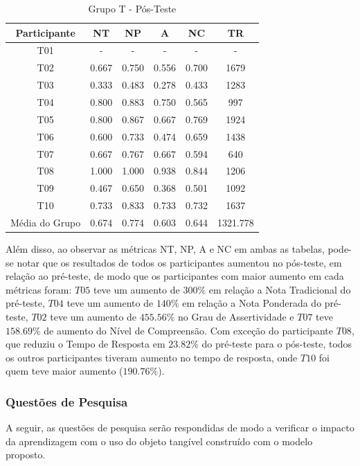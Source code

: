 \begin{table}[htbp]
	\centering
	\caption{Grupo T - Pós-Teste}		
	\begin{tabular}{|c|c|c|c|c|c|}
		\hline
		\rowcolor[HTML]{C0C0C0} 
		\textbf{Participante} & \textbf{NT} & \textbf{NP} & \textbf{A} & \textbf{NC} & \textbf{TR} \\ \hline
		T01 & - & - & - & - & - \\ \hline
		\rowcolor[HTML]{EFEFEF} 
		T02 & 0.667 & 0.750 & 0.556 & 0.700 & 1679 \\ \hline
		T03 & 0.333 & 0.483 & 0.278 & 0.433 & 1283 \\ \hline
		\rowcolor[HTML]{EFEFEF} 
		T04 & 0.800 & 0.883 & 0.750 & 0.565 & 997 \\ \hline
		T05 & 0.800 & 0.867 & 0.667 & 0.769 & 1924 \\ \hline
		\rowcolor[HTML]{EFEFEF} 
		T06 & 0.600 & 0.733 & 0.474 & 0.659 & 1438 \\ \hline
		T07 & 0.667 & 0.767 & 0.667 & 0.594 & 640 \\ \hline
		\rowcolor[HTML]{EFEFEF} 
		T08 & 1.000 & 1.000 & 0.938 & 0.844 & 1206 \\ \hline
		T09 & 0.467 & 0.650 & 0.368 & 0.501 & 1092 \\ \hline
		\rowcolor[HTML]{EFEFEF} 
		T10 & 0.733 & 0.833 & 0.733 & 0.732 & 1637 \\ \hline
		Média do Grupo & 0.674 & 0.774 & 0.603 & 0.644 & 1321.778 \\ \hline
	\end{tabular}
	\label{tab:F1_A01-posteste}
\end{table}

Além disso, ao observar as métricas NT, NP, A e NC em ambas as tabelas, pode-se notar que os resultados de todos os participantes aumentou no pós-teste, em relação ao pré-teste, de modo que os participantes com maior aumento em cada métricas foram: $T05$ teve um aumento de $300\%$ em relação a Nota Tradicional do pré-teste, $T04$ teve um aumento de $140\%$ em relação a Nota Ponderada do pré-teste, $T02$ teve um aumento de $455.56\%$ no Grau de Assertividade e $T07$ teve $158.69\%$ de aumento do Nível de Compreensão. Com exceção do participante $T08$, que reduziu o Tempo de Resposta em $23.82\%$ do pré-teste para o pós-teste, todos os outros participantes tiveram aumento no tempo de resposta, onde $T10$ foi quem teve maior aumento ($190.76\%$).

\subsubsection{Questões de Pesquisa}\label{subsubsection:QP_F1H1}
A seguir, as questões de pesquisa serão respondidas de modo a verificar o impacto da aprendizagem com o uso do objeto tangível construído com o modelo proposto.


